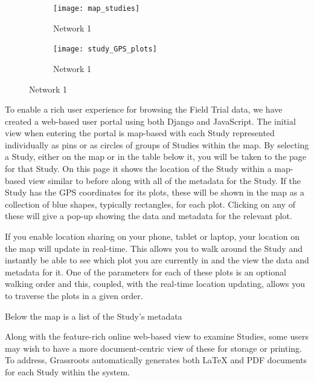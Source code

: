 \documentclass[12pt,a4paper]{extarticle}
\begin{document}
    \begin{figure}
        \centering
        \begin{subfigure}[b]{0.475\textwidth}
            \centering
            \texttt{[image: map\_studies]}
            \caption[{\label{fig:map_studies}The initial map-based view showing the Field Trials in a map-based view.}]%
            {{\small Network 1}}    
            \label{fig:map_studies}
        \end{subfigure}
        \hfill
        \begin{subfigure}[b]{0.475\textwidth}
            \centering
            \texttt{[image: study\_GPS\_plots]}
            \caption[{\label{fig:study_gps_meta}The plots on a  map.}]%
            {{\small Network 1}}    
            \label{fig:study_gps_plots}
        \end{subfigure}
\end{figure}

To enable a rich user experience for browsing the Field Trial data, we have created a web-based user portal using both Django and JavaScript. 
The initial view when entering the portal is map-based with each Study represented individually as pins or as circles of groups of Studies within the map. 
By selecting a Study, either on the map or in the table below it, you will be taken to the page for that Study.
On this page it shows the location of the Study within a map-based view similar to before along with all of the metadata for the Study.
If the Study has the GPS coordinates for its plots, these will be shown in the map as a collection of blue shapes, typically rectangles, for each plot. 
Clicking on any of these will give a pop-up showing the data and metadata for the relevant plot.


If you enable location sharing on your phone, tablet or laptop, your location on the map will update in real-time.
This allows you to walk around the Study and instantly be able to see which plot you are currently in and the view the data and metadata for it.
One of the parameters for each of these plots is an optional walking order and this, coupled, with the real-time location updating, allows you to traverse the plots in a given order.

Below the map is a list of the Study's metadata


Along with the feature-rich online web-based view to examine Studies, some users may wish to have a more document-centric view of these for storage or printing. 
To address, Grassroots automatically generates both LaTeX and PDF documents for each Study within the system.  
\end{document}
